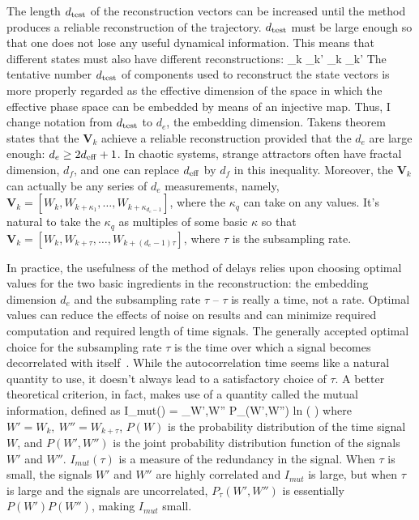 The length $d_{\rm{test}}$ of the reconstruction vectors can be increased until the method produces a reliable reconstruction of the trajectory. $d_{\rm{test}}$ must be large enough so that one does
not lose any useful dynamical information. This means that different states must also have different reconstructions:
\beq
\label{diff_recons}
{}_k _{k'} _k _{k'}
\eeq
The tentative number $d_{\rm{test}}$ of components used to reconstruct the state vectors is more properly regarded as the effective dimension of the space in which the effective phase space
can be embedded by means of an injective map. Thus, I change notation from $d_{\rm{test}}$ to $d_e$, the embedding dimension. Takens theorem states that the ${\mathbf{V}}_k$ achieve
a reliable reconstruction provided that the $d_e$ are large enough: $d_e \ge 2 d_{\rm{eff}} + 1$. In chaotic systems, strange attractors often have fractal dimension, $d_f$, and one can
replace $d_{\rm{eff}}$ by $d_f$ in this inequality.
Moreover, the ${\mathbf{V}}_k$ can actually be any series of $d_e$ measurements, namely, ${\mathbf{V}}_k = [W_k, W_{k + \kappa_1}, \ldots, W_{k + \kappa_{d_e-1}}]$, where the $\kappa_q$ can take on
any values. It's natural to take the $\kappa_q$ as multiples of some basic $\kappa$ so that ${\mathbf{V}}_k = [W_k, W_{k + \tau}, \ldots, W_{k + (d_e-1)\tau}]$, where $\tau$ is the subsampling
rate.

In practice, the usefulness of the method of delays relies upon choosing optimal values for the two basic ingredients in the reconstruction: 
the embedding dimension $d_e$ and the subsampling rate $\tau$ -- $\tau$ is really a time, not a rate. 
Optimal values can reduce the effects of noise on results and can minimize required computation and required length of time signals.
The generally accepted optimal choice for the subsampling rate $\tau$ is the time over which a signal becomes decorrelated with itself~\cite{manneville2004,riedle2013}.
While the autocorrelation time seems like a natural quantity to use, it doesn't always lead to a satisfactory choice of $\tau$. A better theoretical criterion, in fact, makes use
of a quantity called the mutual information, defined as
\beq
\label{mutual_info}
I_{mut}(\tau) = \sum_{W',W''} P_{\tau}(W',W'') \rm{ln} \left(   \right)
\eeq
where $W' = W_k, \ W'' = W_{k+\tau}$, $P(W)$ is the probability distribution of the time signal $W$, and $P(W',W'')$ is the joint probability distribution function of the signals $W'$ and $W''$.
$I_{mut}(\tau)$ is a measure of the redundancy in the signal. When $\tau$ is small, the signals $W'$ and $W''$ are highly correlated and $I_{mut}$ is large, but when $\tau$ is large and the
signals are uncorrelated, $P_{\tau}(W',W'')$ is essentially $P(W') P(W'')$, making $I_{mut}$ small.

